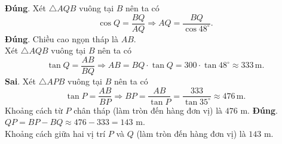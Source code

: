 \begin{ex}
{\begin{center}
	\end{center}
	\begin{itemchoice}
	\itemch \textbf{Đúng}. Xét $\triangle AQB$ vuông tại $B$ nên ta có
	$$\cos Q = \dfrac{BQ}{AQ} \Rightarrow AQ = \dfrac{BQ}{\cos 48^\circ}.$$
	\itemch \textbf{Đúng}. Chiều cao ngọn tháp là $AB$.\\
	Xét $\triangle AQB$ vuông tại $B$ nên ta có
	$$\tan Q = \dfrac{AB}{BQ} \Rightarrow AB = BQ \cdot \tan Q = 300 \cdot \tan 48^\circ \approx 333\,\mathrm{m}.$$
	\itemch \textbf{Sai}. Xét $\triangle APB$ vuông tại $B$ nên ta có
	$$\tan P = \dfrac{AB}{BP} \Rightarrow BP = \dfrac{AB}{\tan P} = \dfrac{333}{\tan 35^\circ} \approx 476\,\mathrm{m}.$$
	Khoảng cách từ $P$ chân tháp (làm tròn đến hàng đơn vị) là $476$ m.
	\itemch \textbf{Đúng}. $QP = BP - BQ \approx 476 - 333 = 143$ m.\\
	Khoảng cách giữa hai vị trí $P$ và $Q$ (làm tròn đến hàng đơn vị) là $143$ m.
	\end{itemchoice}
	}
\end{ex}
